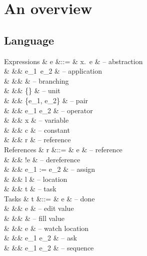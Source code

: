 
\newpage
\section{An overview}


\subsection{Language}

\begin{grammar}
  Expressions
    & e      &::= & \lambda x.\ e               & – abstraction \\
    &        &\mid& e_1\ e_2                    & – application \\
    &        &\mid&           & – branching \\
    &        &\mid& \{\}                        & – unit \\
    &        &\mid& \{e_1, e_2\}                & – pair \\
    &        &\mid& e_1 \star e_2               & – operator \\
    &        &\mid& x                           & – variable \\
    &        &\mid& c                           & – constant \\
    &        &\mid& r                           & – reference \\
  References
    & r      &::= & \Ref e                      & – reference \\
    &        &\mid& !e                          & – dereference \\
    &        &\mid& e_1 := e_2                  & – assign \\
    &        &\mid& l                           & – location \\
    &        &\mid& t                           & – task \\
  Tasks
    & t      &::= & \Done e                     & – done \\
    &        &\mid& \Edit e                     & – edit value \\
    &        &\mid& \Fill \beta                 & – fill value \\
    &        &\mid& \Watch e                    & – watch location \\
    &        &\mid& e_1 \Next e_2               & – ask \\
    &        &\mid& e_1 \Then e_2               & – sequence \\

\end{grammar}
